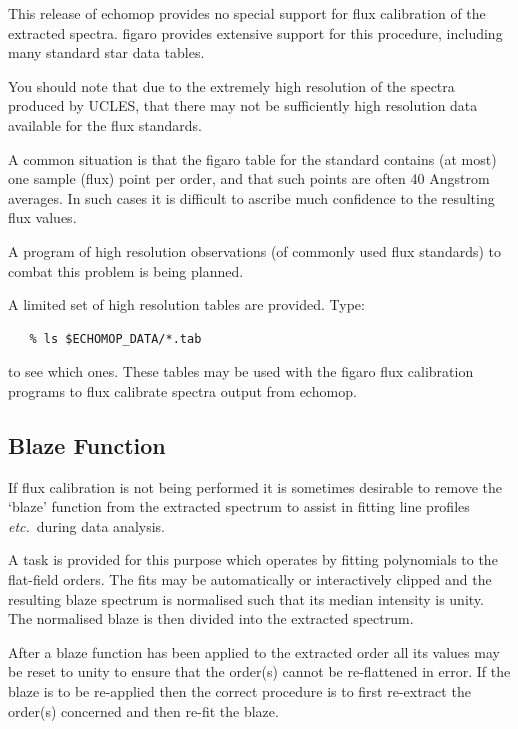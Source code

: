 \documentclass[11pt,twoside]{article}
\newcommand{\xref}[3]{#1}
\newcommand{\xlabel}[1]{}
\newcommand{\mlabel}[1]{\xlabel{#1}\label{#1}}
\newcommand{\myindex}[1]{\index{#1}}
\renewcommand{\myindex}[1]{}
\begin{document}
This release of {\sc echomop} provides no special support for flux
calibration of the extracted spectra.
\xref{{\sc figaro}}{sun86}{} provides extensive support for this procedure,
including many standard star data tables.

You should note that due to the extremely high resolution of the
spectra produced by UCLES, that there may not be sufficiently
high resolution data available for the flux standards.

A common situation is that the \xref{{\sc figaro}}{sun86}{} table for the
standard contains (at most) one sample (flux) point per order, and that
such points are often 40 Angstrom averages. In such cases it is difficult
to ascribe much confidence to the resulting flux values.

A program of high resolution observations (of commonly used flux
standards) to combat this problem is being planned.

A limited set of high resolution tables are provided. Type:

\begin{verbatim}
   % ls $ECHOMOP_DATA/*.tab
\end{verbatim}

to see which ones. These tables may be used with the
\xref{{\sc figaro}}{sun86}{} flux calibration programs
to flux calibrate spectra output from {\sc echomop}.


\subsection{\mlabel{blaze_function}Blaze Function}
\myindex{Blaze}
\myindex{Ripple}

If flux calibration is not being performed it is sometimes desirable
to remove the `blaze' function from the extracted spectrum to assist
in fitting line profiles {\it etc.}\ during data analysis.

A task is provided for this purpose which operates by fitting
polynomials to the flat-field orders. The fits may be automatically
or interactively clipped and the resulting blaze spectrum is
normalised such that its median intensity is unity. The normalised
blaze is then divided into the extracted spectrum.

After a blaze function has been applied to the extracted order all
its values may be reset to unity to ensure that the order(s) cannot
be re-flattened in error. If the blaze is to be
re-applied then the correct procedure is to first re-extract the
order(s) concerned and then re-fit the blaze.
\end{document}
